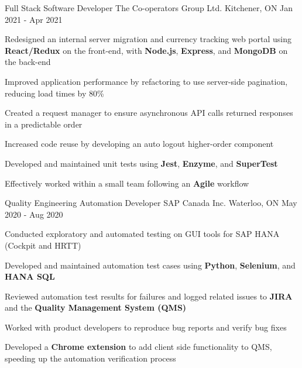 
\begin{cventries}
  \cventry
    {Full Stack Software Developer} %
    {The Co-operators Group Ltd.} %
    {Kitchener, ON} %
    {Jan 2021 - Apr 2021} %
    {
      \begin{cvitems} %
      \item {Redesigned an internal server migration and currency tracking web portal using \textbf{React/Redux} on the front-end, with \textbf{Node.js}, \textbf{Express}, and \textbf{MongoDB} on the back-end}
      \item {Improved application performance by refactoring to use server-side pagination, reducing load times by 80\%}
      \item {Created a request manager to ensure asynchronous API calls returned responses in a predictable order}
      \item {Increased code reuse by developing an auto logout higher-order component}
      \item {Developed and maintained unit tests using \textbf{Jest}, \textbf{Enzyme}, and \textbf{SuperTest}}
      \item {Effectively worked within a small team following an \textbf{Agile} workflow}
      \end{cvitems}
    }
    
  \cventry
    {Quality Engineering Automation Developer} %
    {SAP Canada Inc.} %
    {Waterloo, ON} %
    {May 2020 - Aug 2020} %
    {
      \begin{cvitems} %
      \item {Conducted exploratory and automated testing on GUI tools for SAP HANA (Cockpit and HRTT)}
        \item {Developed and maintained automation test cases using \textbf{Python}, \textbf{Selenium}, and \textbf{HANA SQL}}
		\item {Reviewed automation test results for failures and logged related issues to \textbf{JIRA} and the \textbf{Quality Management System (QMS)}}
		\item {Worked with product developers to reproduce bug reports and verify bug fixes}
		\item {Developed a \textbf{Chrome extension} to add client side functionality to QMS, speeding up the automation verification process}
      \end{cvitems}
    }
       
\end{cventries}
